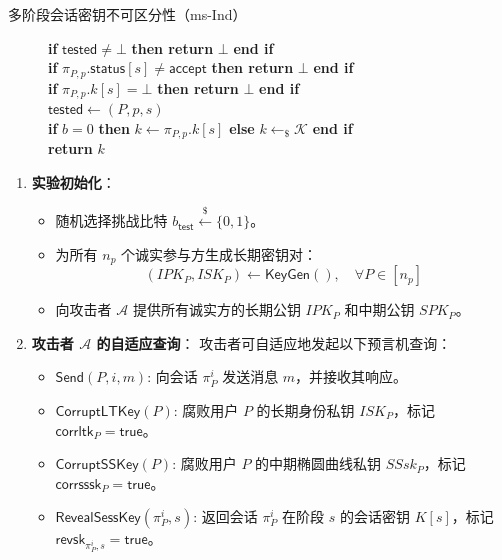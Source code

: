 \begin{definition}{多阶段会话密钥不可区分性（ms-Ind）}
\begin{figure}[htbp]
\begin{minipage}[t]{0.48\textwidth}
        \textbf{if} $\mathsf{tested} \neq \bot$ \textbf{then return} $\bot$ \textbf{ end if} \\
        \textbf{if} $\pi_{P,p}.\mathsf{status}[s] \neq \mathsf{accept}$ \textbf{then return} $\bot$ \textbf{ end if} \\
        \textbf{if} $\pi_{P,p}.k[s] = \bot$ \textbf{then return} $\bot$ \textbf{ end if} \\
        $\mathsf{tested} \gets (P,p,s)$ \\
        \textbf{if} $b = 0$ \textbf{then} $k \gets \pi_{P,p}.k[s]$ \textbf{ else} $k \gets_{\$} \mathcal{K}$ \textbf{ end if} \\
        \textbf{return} $k$
    \end{minipage}
\end{figure}
\begin{enumerate}[leftmargin=*,noitemsep]
  \item \textbf{实验初始化}：
    \begin{itemize}[leftmargin=*,noitemsep]
      \item 随机选择挑战比特 $b_{\mathsf{test}} \xleftarrow{\$} \{0,1\}$。
      \item 为所有 $n_p$ 个诚实参与方生成长期密钥对：
        \[
        (IPK_P, ISK_P) \leftarrow \mathsf{KeyGen}(), \quad \forall P \in [n_p]
        \]
      \item 向攻击者 $\mathcal{A}$ 提供所有诚实方的长期公钥 $IPK_P$ 和中期公钥 $SPK_P$。
    \end{itemize}

  \item \textbf{攻击者 $\mathcal{A}$ 的自适应查询}：
    攻击者可自适应地发起以下预言机查询：
    \begin{itemize}[leftmargin=*,itemsep=1.2ex]
      \item {$\mathsf{Send}(P, i, m)$}: 向会话 $\pi_P^i$ 发送消息 $m$，并接收其响应。
      
      \item {$\mathsf{CorruptLTKey}(P)$}: 腐败用户 $P$ 的长期身份私钥 $ISK_P$，标记 $\mathsf{corrltk}_P = \mathsf{true}$。
      
      \item {$\mathsf{CorruptSSKey}(P)$}: 腐败用户 $P$ 的中期椭圆曲线私钥 $SSsk_P$，标记 $\mathsf{corrsssk}_P = \mathsf{true}$。
      
      \item {$\mathsf{RevealSessKey}(\pi_P^i, s)$}: 返回会话 $\pi_P^i$ 在阶段 $s$ 的会话密钥 $K[s]$，标记 $\mathsf{revsk}_{\pi_P^i,s} = \mathsf{true}$。
      

\end{itemize}
\end{enumerate}
\end{definition}
